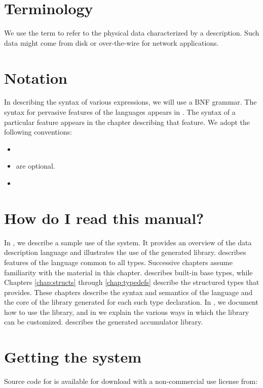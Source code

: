 \section{Terminology}
We use the term \textit{\external{}} to refer to the physical
data characterized by a \PADS{} description.  Such data might 
come from disk or over-the-wire for network applications.

\section{Notation}
In describing the syntax of various \PADSL{} expressions, we will use
a BNF grammar.  The syntax for pervasive features of the languages
appears in .  The syntax of a particular
feature appears in the chapter describing that feature.
We adopt the following conventions:
\begin{itemize}
\item {}
\item {} are optional.
\item {}

\end{itemize}

\section{How do I read this manual?}
In , we describe a sample use of the \PADS{}
system. It provides an overview of the data description language and
illustrates the use of the generated library.
 describes features of the \PADS{}
language common to all \padsl{} types.  Successive chapters assume
familiarity with the material in this chapter.
 describes built-in \padsl{} base types, while
Chapters \ref{chap:structs} through \ref{chap:typedefs} describe the
structured types that \padsl{} provides. These chapters describe the
syntax and semantics of the \pads{} language and the core of the
library generated for each such type declaration.
In , we document how to use the \pads{}
library, and in  we explain the various
ways in which the \pads{} library can be customized. 
 describes the generated accumulator
library.


\section{Getting the \PADS{} system}
Source code for \PADS{} is available for download with
a non-commercial use license from: 

